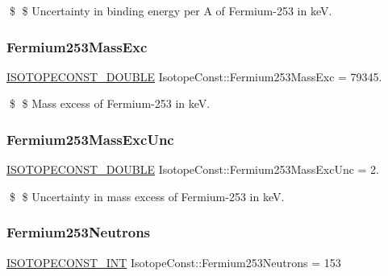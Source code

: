\$ \$ Uncertainty in binding energy per A of Fermium-\/253 in keV. \mbox{\label{group___isotope_const-_fermium-_fm253_ga7cf380e53ac85fb6304d194c237bcee3}} 
\subsubsection{\texorpdfstring{Fermium253\+Mass\+Exc}{Fermium253MassExc}}
{\footnotesize\ttfamily \mbox{\hyperlink{group___isotope_const-_macros_ga8f45a7272ce02c0b4c65c44636ed719a}{I\+S\+O\+T\+O\+P\+E\+C\+O\+N\+S\+T\+\_\+\+D\+O\+U\+B\+LE}} Isotope\+Const\+::\+Fermium253\+Mass\+Exc = 79345.}

\$ \$ Mass excess of Fermium-\/253 in keV. \mbox{\label{group___isotope_const-_fermium-_fm253_gab0ae2eb7d6e791218f9f49b42839aee3}} 
\subsubsection{\texorpdfstring{Fermium253\+Mass\+Exc\+Unc}{Fermium253MassExcUnc}}
{\footnotesize\ttfamily \mbox{\hyperlink{group___isotope_const-_macros_ga8f45a7272ce02c0b4c65c44636ed719a}{I\+S\+O\+T\+O\+P\+E\+C\+O\+N\+S\+T\+\_\+\+D\+O\+U\+B\+LE}} Isotope\+Const\+::\+Fermium253\+Mass\+Exc\+Unc = 2.}

\$ \$ Uncertainty in mass excess of Fermium-\/253 in keV. \mbox{\label{group___isotope_const-_fermium-_fm253_ga775999e5e5aea8331c70e6f61e5a26c9}} 
\subsubsection{\texorpdfstring{Fermium253\+Neutrons}{Fermium253Neutrons}}
{\footnotesize\ttfamily \mbox{\hyperlink{group___isotope_const-_macros_ga5f18360b3e99483a35c32d789e62621c}{I\+S\+O\+T\+O\+P\+E\+C\+O\+N\+S\+T\+\_\+\+I\+NT}} Isotope\+Const\+::\+Fermium253\+Neutrons = 153}

